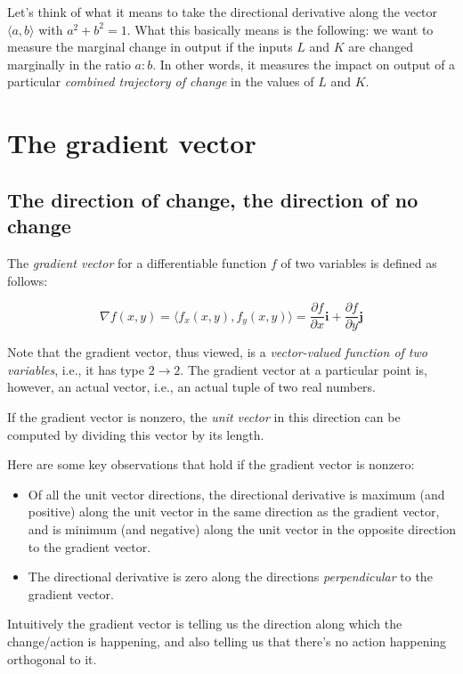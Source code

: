 \documentclass[10pt]{amsart}
\begin{document}
Let's think of what it means to take the directional derivative along
the vector $\langle a, b \rangle$ with $a^2 + b^2 = 1$. What this
basically means is the following: we want to measure the marginal
change in output if the inputs $L$ and $K$ are changed marginally in
the ratio $a:b$. In other words, it measures the impact on output of a
particular {\em combined trajectory of change} in the values of $L$
and $K$.

\section{The gradient vector}

\subsection{The direction of change, the direction of no change}

The {\em gradient vector} for a differentiable function $f$ of two
variables is defined as follows:

$$\nabla f(x,y) = \langle f_x(x,y), f_y(x,y) \rangle = \frac{\partial f}{\partial x}\mathbf{i} + \frac{\partial f}{\partial y}\mathbf{j}$$

Note that the gradient vector, thus viewed, is a {\em vector-valued
function of two variables}, i.e., it has type $2 \to 2$. The gradient
vector at a particular point is, however, an actual vector, i.e., an
actual tuple of two real numbers.

If the gradient vector is nonzero, the {\em unit vector} in this
direction can be computed by dividing this vector by its length.

Here are some key observations that hold if the gradient vector is
nonzero:

\begin{itemize}
\item Of all the unit vector directions, the directional derivative is
  maximum (and positive) along the unit vector in the same direction
  as the gradient vector, and is minimum (and negative) along the unit
  vector in the opposite direction to the gradient vector.
\item The directional derivative is zero along the directions {\em
  perpendicular} to the gradient vector.
\end{itemize}

Intuitively the gradient vector is telling us the direction along
which the change/action is happening, and also telling us that there's
no action happening orthogonal to it.
\end{document}
